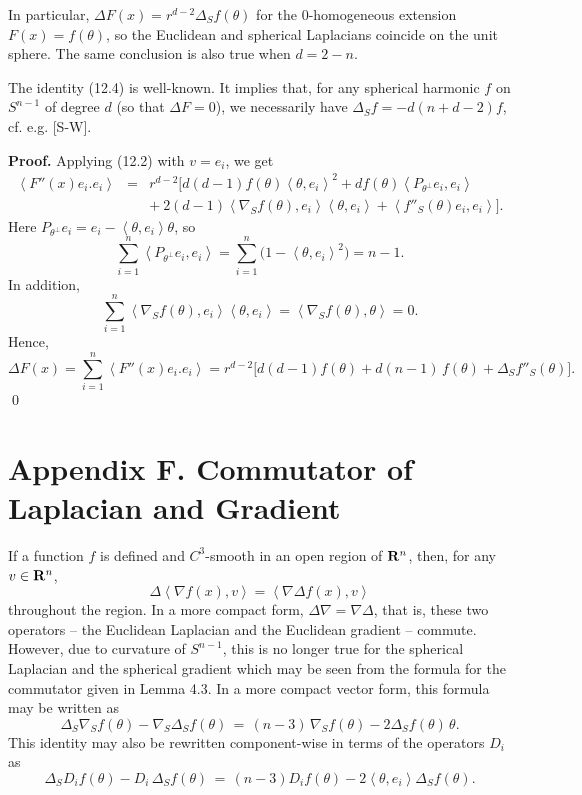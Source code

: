\documentclass[reqno,12pt]{amsart}
\theoremstyle{plain}
\begin{document}
\vskip2mm
In particular, $\Delta F(x) = r^{d-2} \Delta_S f(\theta)$
for the $0$-homogeneous extension $F(x) = f(\theta)$,
so the Euclidean and spherical Laplacians coincide on the unit sphere.
The same conclusion is also true when $d = 2-n$.

The identity (12.4) is well-known. It implies that, for any spherical 
harmonic $f$ on $S^{n-1}$ of degree $d$ (so that $\Delta F = 0$), we 
necessarily have $\Delta_S f = -d(n+d-2) f$, cf. e.g. [S-W].

\vskip5mm
{\bf Proof.} Applying (12.2) with $v = e_i$, we get
\begin{eqnarray*}
\left<F''(x)e_i.e_i\right>
 & = &
r^{d-2} \big[d(d-1) f(\theta) \left<\theta,e_i\right>^2 + 
d f(\theta) \left<P_{\theta^\perp}e_i,e_i\right>  \\
 & & + \ 
2(d-1) \left<\nabla_S f(\theta),e_i\right> \left<\theta,e_i\right> +
\left<f''_S(\theta)e_i,e_i\right>\big].
\end{eqnarray*}
Here $P_{\theta^\perp}e_i = e_i - \left<\theta,e_i\right>\theta$, so
$$
\sum_{i=1}^n \left<P_{\theta^\perp}e_i,e_i\right> =
\sum_{i=1}^n \big(1 - \left<\theta,e_i\right>^2\big) = n-1.
$$
In addition,
$$
\sum_{i=1}^n \left<\nabla_S f(\theta),e_i\right> \left<\theta,e_i\right> =
\left<\nabla_S f(\theta),\theta\right> = 0.
$$
Hence,
$$
\Delta F(x) = 
\sum_{i=1}^n \left<F''(x)e_i.e_i\right> =
r^{d-2} \big[d(d-1) f(\theta) + 
d (n-1)\,f(\theta) + \Delta_S f''_S(\theta)\big].
$$
\qed

\vskip10mm
\section{{\bf Appendix F. Commutator of Laplacian and Gradient}}
\setcounter{equation}{0}

\vskip2mm
\noindent
If a function $f$ is defined and $C^3$-smooth in an open region of ${{\bf R}}^n$,
then, for any $v \in {{\bf R}}^n$,
\begin{equation}
\Delta \left<\nabla f(x),v\right> = \left<\nabla \Delta f(x),v\right>
\end{equation}
throughout the region. In a more compact form,
$\Delta \nabla = \nabla \Delta$, that is, these two operators -- the
Euclidean Laplacian and the Euclidean gradient -- commute.
However, due to curvature of $S^{n-1}$, this is no longer true for 
the spherical Laplacian and the spherical gradient which may be seen from 
the formula for the commutator given in Lemma 4.3.
In a more compact vector form, this formula may be written as
$$
\Delta_S \nabla_S f(\theta) - \nabla_S \Delta_S f(\theta) \, = \,  
(n-3)\,\nabla_S f(\theta) - 2\Delta_S f(\theta)\,\theta.
$$
This identity may also be rewritten component-wise in terms of the operators 
$D_i$ as
$$
\Delta_S D_i f(\theta) - D_i\, \Delta_S f(\theta) \, = \,  
(n-3) D_i f(\theta) - 2\left<\theta,e_i\right>\Delta_S f(\theta).
$$
\end{document}
